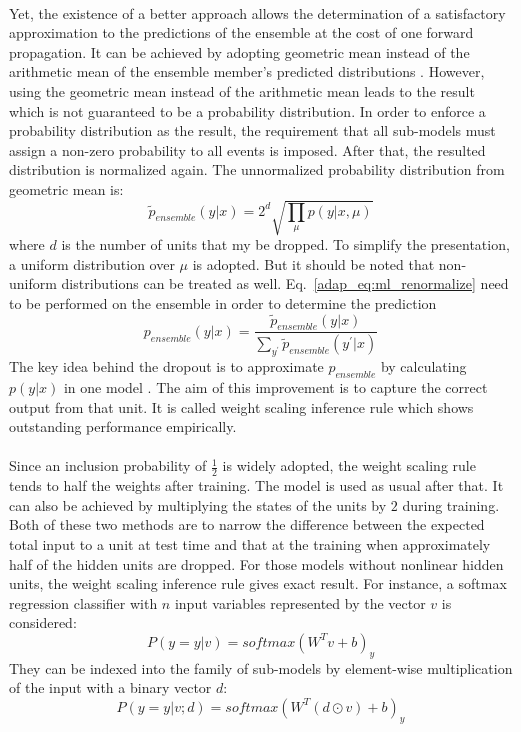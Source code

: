 \paragraph{}
Yet, the existence of a better approach allows the determination of a satisfactory approximation to the predictions of the ensemble at the cost of one forward propagation.
It can be achieved by adopting geometric mean instead of the arithmetic mean of the ensemble member's predicted distributions \citep{WardeFarley2014SelfinformedNN}.
However, using the geometric mean instead of the arithmetic mean leads to the result which is not guaranteed to be a probability distribution.
In order to enforce a probability distribution as the result, the requirement that all sub-models must assign a non-zero probability to all events is imposed.
After that, the resulted distribution is normalized again.
The unnormalized probability distribution from geometric mean is:
\begin{equation}
    \tilde{p}_{ensemble}(y|x) = 2^d \sqrt{\prod_\mu p(y|x,\mu)}
\end{equation}
%
where $d$ is the number of units that my be dropped.
To simplify the presentation, a uniform distribution over $\mu$ is adopted.
But it should be noted that non-uniform distributions can be treated as well.
Eq.~\ref{adap_eq:ml_renormalize} need to be performed on the ensemble in order to determine the prediction
\begin{equation}
    p_{ensemble}(y|x) = \frac{
        \tilde{p}_{ensemble}(y|x)
    }{
        \sum_{y^\prime} \tilde{p}_{ensemble}(y^\prime|x)
    }
    \label{adap_eq:ml_renormalize}
\end{equation}
%
The key idea behind the dropout is to approximate $p_{ensemble}$ by calculating $p(y|x)$ in one model \citep{hinton2012}.
The aim of this improvement is to capture the correct output from that unit.
It is called weight scaling inference rule which shows outstanding performance empirically.
\paragraph{}
Since an inclusion probability of $\frac{1}{2}$ is widely adopted, the weight scaling rule tends to half the weights after training.
The model is used as usual after that.
It can also be achieved by multiplying the states of the units by $2$ during training.
Both of these two methods are to narrow the difference between the expected total input to a unit at test time and that at the training when approximately half of the hidden units are dropped.
For those models without nonlinear hidden units, the weight scaling inference rule gives exact result.
For instance, a softmax regression classifier with $n$ input variables represented by the vector $v$ is considered:
\begin{equation}
    P(y=y|v)=softmax(W^Tv+b)_y
\end{equation}
%
They can be indexed into the family of sub-models by element-wise multiplication of the input with a binary vector $d$:
\begin{equation}
    P(y=y|v;d) = softmax(W^T(d \odot v)+b)_y
\end{equation}


